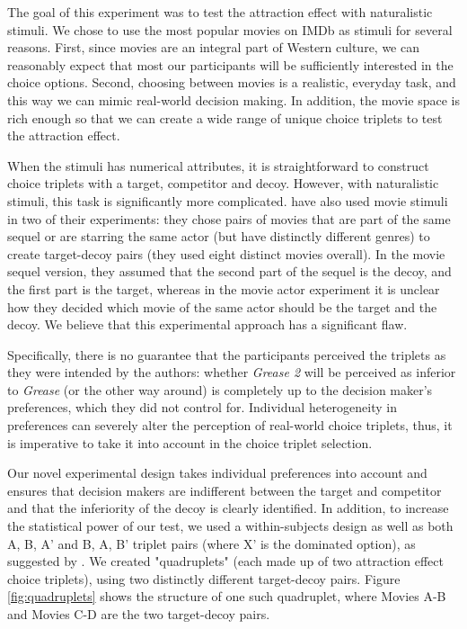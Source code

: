 \documentclass[12pt, a4paper]{article}
\begin{document}
The goal of this experiment was to test the attraction effect with naturalistic stimuli. We chose to use the most popular movies on IMDb as stimuli for several reasons. First, since movies are an integral part of Western culture, we can reasonably expect that most our participants will be sufficiently interested in the choice options. Second, choosing between movies is a realistic, everyday task, and this way we can mimic real-world decision making. In addition, the movie space is rich enough so that we can create a wide range of unique choice triplets to test the attraction effect.

When the stimuli has numerical attributes, it is straightforward to construct choice triplets with a target, competitor and decoy. However, with naturalistic stimuli, this task is significantly more complicated. \citeauthor{Frederick2014} have also used movie stimuli in two of their experiments: they chose pairs of movies that are part of the same sequel or are starring the same actor (but have distinctly different genres) to create target-decoy pairs (they used eight distinct movies overall). In the movie sequel version, they assumed that the second part of the sequel is the decoy, and the first part is the target, whereas in the movie actor experiment it is unclear how they decided which movie of the same actor should be the target and the decoy. We believe that this experimental approach has a significant flaw.

Specifically, there is no guarantee that the participants perceived the triplets as they were intended by the authors: whether \textit{Grease 2} will be perceived as inferior to \textit{Grease} (or the other way around) is completely up to the decision maker's preferences, which they did not control for. Individual heterogeneity in preferences can severely alter the perception of real-world choice triplets, thus, it is imperative to take it into account in the choice triplet selection.

Our novel experimental design takes individual preferences into account and ensures that decision makers are indifferent between the target and competitor and that the inferiority of the decoy is clearly identified. In addition, to increase the statistical power of our test, we used a within-subjects design as well as both A, B, A' and B, A, B' triplet pairs (where X' is the dominated option), as suggested by . We created "quadruplets" (each made up of two attraction effect choice triplets), using two distinctly different target-decoy pairs. Figure \ref{fig:quadruplets} shows the structure of one such quadruplet, where Movies A-B and Movies C-D are the two target-decoy pairs.
\end{document}
